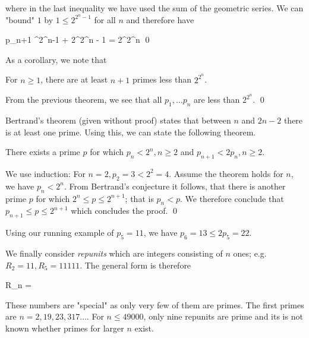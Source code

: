 where in the last inequality we have used the sum of the geometric series. We can "bound" $1$ by $1 \leq 2^{2^{n} - 1}$ for all $n$ and therefore have

\bee
p_{n+1} ^{2^{n}-1} + 2^{2^{n} - 1} = 2^{2^{n}} \qed
\eee

As a corollary, we note that

\begin{theorem}
    For $n \geq 1$, there are at least $n+1$ primes less than $2^{2^{n}}$.
\end{theorem}

From the previous theorem, we see that all $p_1, \ldots p_n$ are less than $2^{2^{n}}$. \qed

Bertrand's theorem (given without proof) states that between $n$ and $2n-2$ there is at least one prime. Using this, we can state the following theorem.

\begin{theorem}
    There exists a prime $p$ for which $p_n < 2^n, n \geq 2$ and $p_{n+1} < 2 p_n, n \geq 2$.
\end{theorem}

We use induction: For $n = 2, p_2 = 3 < 2^2 = 4$. Assume the theorem holds for $n$, we have $p_n < 2^n$. From Bertrand's conjecture it follows, that there is another prime $p$ for which $2^n \leq p \leq 2^{n+1}$; that is $p_n < p$. We therefore conclude that $p_{n+1} \leq p \leq 2^{n+1}$ which concludes the proof. \qed

Using our running example of $p_5 = 11$, we have $p_6 = 13 \leq 2 p_5 = 22$.

We finally consider \emph{repunits} which are integers consisting of $n$ ones; e.g. $R_2 = 11, R_5 =11111$. The general form is therefore

\bee
R_n = 
\eee

These numbers are "special" as only very few of them are primes. The first primes are $n = 2, 19, 23, 317 \ldots$. For $n \leq 49000$, only nine repunits are prime and its is not known whether primes for larger $n$ exist.


